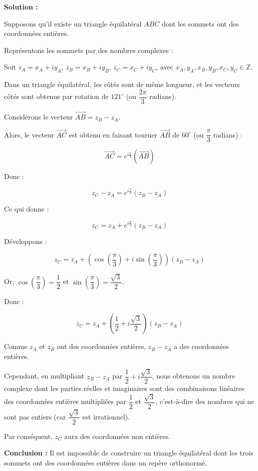 \documentclass[a4paper,12pt]{article}
\begin{document}
\begin{solutionbox}
\textbf{Solution :}

Supposons qu'il existe un triangle équilatéral \( ABC \) dont les sommets ont des coordonnées entières.

Représentons les sommets par des nombres complexes :

Soit \( z_A = x_A + i y_A \), \( z_B = x_B + i y_B \), \( z_C = x_C + i y_C \), avec \( x_A, y_A, x_B, y_B, x_C, y_C \in \mathbb{Z} \).

Dans un triangle équilatéral, les côtés sont de même longueur, et les vecteurs côtés sont obtenus par rotation de \( 121^\circ \) (ou \( \dfrac{2\pi}{3} \) radians).

Considérons le vecteur \( \overrightarrow{AB} = z_B - z_A \).

Alors, le vecteur \( \overrightarrow{AC} \) est obtenu en faisant tourner \( \overrightarrow{AB} \) de \( 60^\circ \) (ou \( \dfrac{\pi}{3} \) radians) :

\[
\overrightarrow{AC} = e^{i\frac{\pi}{3}} (\overrightarrow{AB})
\]

Donc :

\[
z_C - z_A = e^{i\frac{\pi}{3}} (z_B - z_A)
\]

Ce qui donne :

\[
z_C = z_A + e^{i\frac{\pi}{3}} (z_B - z_A)
\]

Développons :

\[
z_C = z_A + \left( \cos\left( \dfrac{\pi}{3} \right) + i \sin\left( \dfrac{\pi}{3} \right) \right) (z_B - z_A)
\]

Or, \( \cos\left( \dfrac{\pi}{3} \right) = \dfrac{1}{2} \) et \( \sin\left( \dfrac{\pi}{3} \right) = \dfrac{\sqrt{3}}{2} \).

Donc :

\[
z_C = z_A + \left( \dfrac{1}{2} + i \dfrac{\sqrt{3}}{2} \right) (z_B - z_A)
\]

Comme \( z_A \) et \( z_B \) ont des coordonnées entières, \( z_B - z_A \) a des coordonnées entières.

Cependant, en multipliant \( z_B - z_A \) par \( \dfrac{1}{2} + i \dfrac{\sqrt{3}}{2} \), nous obtenons un nombre complexe dont les parties réelles et imaginaires sont des combinaisons linéaires des coordonnées entières multipliées par \( \dfrac{1}{2} \) et \( \dfrac{\sqrt{3}}{2} \), c'est-à-dire des nombres qui ne sont pas entiers (car \( \dfrac{\sqrt{3}}{2} \) est irrationnel).

Par conséquent, \( z_C \) aura des coordonnées non entières.

\textbf{Conclusion :} Il est impossible de construire un triangle équilatéral dont les trois sommets ont des coordonnées entières dans un repère orthonormé.

\end{solutionbox}
\end{document}
